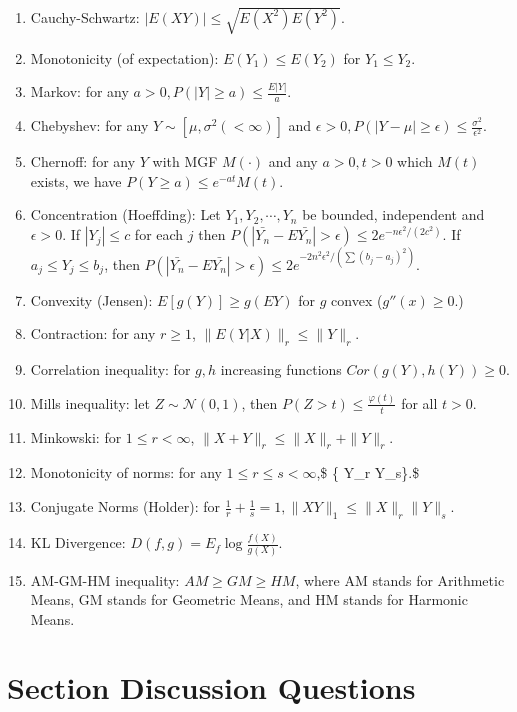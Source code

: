 \documentclass[
  letterpaper,
  DIV=11,
  numbers=noendperiod]{scrreprt}
\newcommand{\N}{\mathcal{N}}
\theoremstyle{plain}
\theoremstyle{definition}
\theoremstyle{remark}
\begin{document}
\begin{enumerate}
\def\labelenumi{\arabic{enumi}.}
\item
  Cauchy-Schwartz: \({|E(XY)| \leq \sqrt{ E(X^2)E(Y^2) }}.\)
\item
  Monotonicity (of expectation): \(E(Y_1) \leq E(Y_2)\) for
  \(Y_1\leq Y_2.\)
\item
  Markov: for any \(a>0, {P(|Y|\geq a ) \leq \frac{E|Y|}{a} }.\)
\item
  Chebyshev: for any \(Y\sim [\mu,\sigma^2 (<\infty)]\) and
  \(\epsilon>0, {P(|Y-\mu| \geq \epsilon ) \leq \frac{\sigma^2}{\epsilon^2}}.\)
\item
  Chernoff: for any \(Y\) with MGF \(M(\cdot)\) and any \(a>0,t>0\)
  which \(M(t)\) exists, we have \(P(Y\geq a ) \leq e^{-at}M(t).\)
\item
  Concentration (Hoeffding): Let \(Y_1,Y_2,\cdots,Y_n\) be bounded,
  independent and \(\epsilon>0.\) If \(|Y_j|\leq c\) for each \(j\) then
  \(P( |\bar{Y_n} - E\bar{Y_n}|>\epsilon ) \leq 2 e^{-n\epsilon^2 /(2c^2)}.\)
  If \(a_j \leq Y_j \leq b_j\), then
  \(P( |\bar{Y_n} - E\bar{Y_n}|>\epsilon ) \leq 2 e^{-2n^2\epsilon^2 /(\sum (b_j-a_j)^2)}.\)
\item
  Convexity (Jensen): \(E[g(Y)] \geq g(EY)\) for \(g\) convex
  (\(g''(x) \geq 0.\))
\item
  Contraction: for any \(r\geq 1\), \(\| E(Y|X)\| _r \leq \|Y\|_r.\)
\item
  Correlation inequality: for \(g,h\) increasing functions
  \(Cor(g(Y),h(Y)) \geq 0.\)
\item
  Mills inequality: let \(Z \sim \N(0,1)\), then
  \(P(Z > t ) \leq \frac{\varphi(t)}{t}\) for all \(t>0.\)
\item
  Minkowski: for \(1\leq r <\infty\),
  \(\|X+Y\|_r \leq \|X\|_r + \|Y\|_r.\)
\item
  Monotonicity of norms: for any \(1 \leq r \leq s <\infty\),\$ \{
  \textbar Y\textbar\_r \leq \textbar Y\textbar\_s\}.\$
\item
  Conjugate Norms (Holder): for
  \(\frac{1}{r} + \frac{1}{s}= 1, {\|XY\|_1 \leq \|X\|_r \|Y\|_s}.\)
\item
  KL Divergence: \(D(f,g) = E_f \log \frac{f(X)}{g(X)}.\)
\item
  AM-GM-HM inequality: \(AM \geq GM \geq HM\), where AM stands for
  Arithmetic Means, GM stands for Geometric Means, and HM stands for
  Harmonic Means.
\end{enumerate}

\hypertarget{section-discussion-questions-6}{%
\section*{Section Discussion
Questions}\label{section-discussion-questions-6}}
\end{document}

